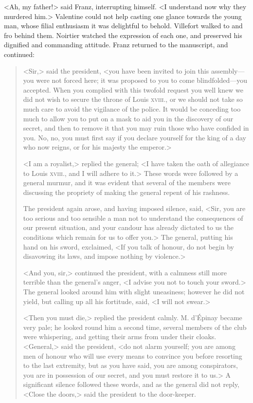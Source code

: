  <Ah, my father!> said Franz, interrupting himself. <I understand now why they murdered him.> Valentine could not help casting one glance towards the young man, whose filial enthusiasm it was delightful to behold. Villefort walked to and fro behind them. Noirtier watched the expression of each one, and preserved his dignified and commanding attitude. Franz returned to the manuscript, and continued: 


\begin{quotation}
<Sir,> said the president, <you have been invited to join this assembly—you were not forced here; it was proposed to you to come blindfolded—you accepted. When you complied with this twofold request you well knew we did not wish to secure the throne of Louis \textsc{xviii.}, or we should not take so much care to avoid the vigilance of the police. It would be conceding too much to allow you to put on a mask to aid you in the discovery of our secret, and then to remove it that you may ruin those who have confided in you. No, no, you must first say if you declare yourself for the king of a day who now reigns, or for his majesty the emperor.> 

<I am a royalist,> replied the general; <I have taken the oath of allegiance to Louis \textsc{xviii.}, and I will adhere to it.> These words were followed by a general murmur, and it was evident that several of the members were discussing the propriety of making the general repent of his rashness. 

The president again arose, and having imposed silence, said, <Sir, you are too serious and too sensible a man not to understand the consequences of our present situation, and your candour has already dictated to us the conditions which remain for us to offer you.> The general, putting his hand on his sword, exclaimed, <If you talk of honour, do not begin by disavowing its laws, and impose nothing by violence.> 

<And you, sir,> continued the president, with a calmness still more terrible than the general's anger, <I advise you not to touch your sword.> The general looked around him with slight uneasiness; however he did not yield, but calling up all his fortitude, said, <I will not swear.> 

<Then you must die,> replied the president calmly. M. d'Épinay became very pale; he looked round him a second time, several members of the club were whispering, and getting their arms from under their cloaks. <General,> said the president, <do not alarm yourself; you are among men of honour who will use every means to convince you before resorting to the last extremity, but as you have said, you are among conspirators, you are in possession of our secret, and you must restore it to us.> A significant silence followed these words, and as the general did not reply, <Close the doors,> said the president to the door-keeper.  


\end{quotation}
